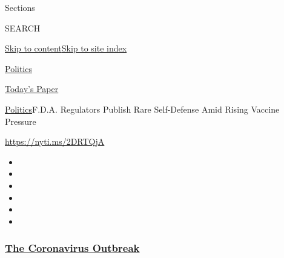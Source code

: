 Sections

SEARCH

\protect\hyperlink{site-content}{Skip to
content}\protect\hyperlink{site-index}{Skip to site index}

\href{https://www.nytimes3xbfgragh.onion/section/politics}{Politics}

\href{https://myaccount.nytimes3xbfgragh.onion/auth/login?response_type=cookie\&client_id=vi}{}

\href{https://www.nytimes3xbfgragh.onion/section/todayspaper}{Today's
Paper}

\href{/section/politics}{Politics}\textbar{}F.D.A. Regulators Publish
Rare Self-Defense Amid Rising Vaccine Pressure

\url{https://nyti.ms/2DRTQjA}

\begin{itemize}
\item
\item
\item
\item
\item
\item
\end{itemize}

\hypertarget{the-coronavirus-outbreak}{%
\subsubsection{\texorpdfstring{\href{https://www.nytimes3xbfgragh.onion/news-event/coronavirus?name=styln-coronavirus-national\&region=TOP_BANNER\&block=storyline_menu_recirc\&action=click\&pgtype=Article\&impression_id=c5814b50-f4be-11ea-a306-edc47b8f412f\&variant=undefined}{The
Coronavirus
Outbreak}}{The Coronavirus Outbreak}}\label{the-coronavirus-outbreak}}

